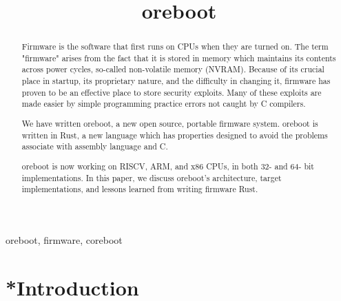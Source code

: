 \documentclass[conference]{IEEEtran}
\begin{document}
\title{oreboot}

\author{
\and
{}

}

\maketitle

\begin{abstract}
Firmware is the software that first runs on CPUs when they are turned on. 
The term "firmware" arises from the fact that it is stored in memory which maintains
its contents across power cycles, so-called non-volatile memory (NVRAM). 
Because of its crucial place in startup, its proprietary nature, and the difficulty in changing it, firmware has proven to be an effective place to store security exploits\cite{cui2013firmware}. Many of these exploits are made easier
by simple programming practice errors not caught by C compilers\cite{wojtczuk2015attacks}.

We have written oreboot, a new open source, portable firmware system. 
oreboot is written in Rust\cite{balasubramanian2017system}, a new language which 
has properties designed to avoid the problems associate with assembly language and C.

oreboot is now working on RISCV, ARM, and x86 CPUs, in both 32- and 64- bit implementations. In this paper, we discuss oreboot's architecture, target implementations,
and lessons learned from writing firmware Rust. 


\end{abstract}

\begin{IEEEkeywords}
oreboot, firmware, coreboot
\end{IEEEkeywords}

\section{*Introduction}
\end{document}

